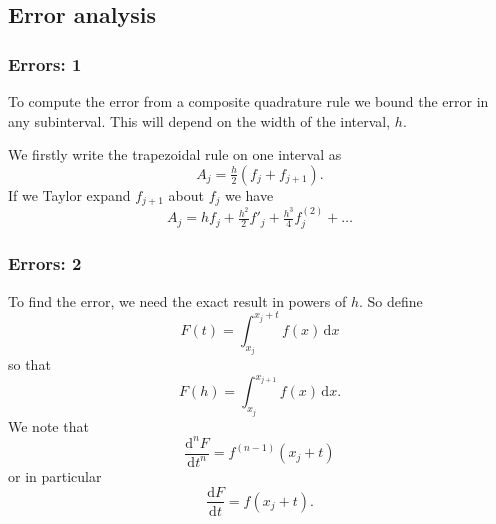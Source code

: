 \documentclass{beamer}
\begin{document}
 \subsection{Error analysis}


 \begin{frame}
   \frametitle{Errors: 1}

   To compute the error from a composite quadrature rule we bound the
   error in any subinterval. This will depend on the width of the
   interval, $h$. \pause

   \vspace{1ex}

   We firstly write the trapezoidal rule on one interval as
   \begin{equation*}
     A_j = \tfrac{h}{2} \left(f_j + f_{j+1}\right).
   \end{equation*} \pause
   If we Taylor expand $f_{j+1}$ about $f_j$ we have
   \begin{equation*}
     A_j = h f_j + \tfrac{h^2}{2} f'_j + \tfrac{h^3}{4} f^{(2)}_j + \dots
   \end{equation*}
 \end{frame}

 \begin{frame}
   \frametitle{Errors: 2}

   To find the error, we need the exact result in powers of $h$. So define
   \begin{equation*}
     F(t) = \int_{x_j}^{x_j + t} f(x) \, \text{d}x
   \end{equation*}
   so that
   \begin{equation*}
     F(h) = \int_{x_j}^{x_{j+1}} f(x) \, \text{d}x.
   \end{equation*}
   We note that
   \begin{equation*}
     \frac{\text{d}^n F}{\text{d}t^n} = f^{(n-1)}(x_j + t)
   \end{equation*}
   or in particular
   \begin{equation*}
     \frac{\text{d} F}{\text{d}t} = f(x_j + t).
   \end{equation*}
 \end{frame}
\end{document}
